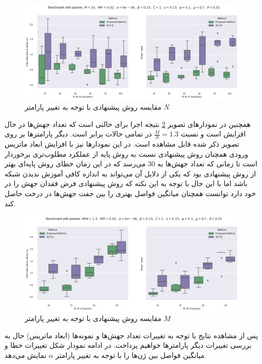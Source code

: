 \begin{figure}[!ht]
	\centering
	\includegraphics[width=\textwidth]{img/chaps/er/comp_change_N}
	\caption{‌مقایسه روش پیشنهادی با توجه به تغییر پارامتر $N$}
	\label{fig:ch_er:comp_change_N}
\end{figure}
\noindent
همچنین در نمودارهای تصویر \ref{fig:ch_er:comp_change_M} نتیجه اجرا برای حالتی است که تعداد جهش‌ها در حال افزایش است و نسبت $\frac{M}{N}=1.3$ در تمامی حالات برابر است. دیگر پارامترها بر روی تصویر ذکر شده قابل مشاهده است. در این نمودارها نیز با افزایش ابعاد ماتریس ورودی همچنان روش پیشنهادی نسبت به روش پایه از عملکرد مطلوب‌تری برخوردار است تا زمانی که تعداد جهش‌ها به $30$ می‌رسد که در این زمان خطای روش پایه‌ای بهتر از روش پیشنهادی بود که یکی از دلایل آن می‌تواند به اندازه کافی آموزش ندیدن شبکه باشد اما با این حال با توجه به این نکته که روش پیشنهادی فرض فقدان جهش را در خود دارد توانست همچنان میانگین فواصل بهتری را بین جفت جهش‌ها در درخت حاصل کند.
\begin{figure}[!ht]
	\centering
	\includegraphics[width=\textwidth]{img/chaps/er/comp_change_M}
	\caption{‌مقایسه روش پیشنهادی با توجه به تغییر پارامتر $M$}
	\label{fig:ch_er:comp_change_M}
\end{figure}
\noindent
پس از مشاهده نتایج با توجه به تغییرات تعداد جهش‌ها و نمونه‌ها (ابعاد ماتریس) حال به بررسی تغییرات دیگر پارامترها خواهیم پرداخت. در ادامه نمودار شکل \label{fig:ch_er:comp_change_alpha} تغییرات خطا و میانگین فواصل بین ژن‌ها را با توجه به تغییر پارامتر $\alpha$ نمایش می‌دهد.

